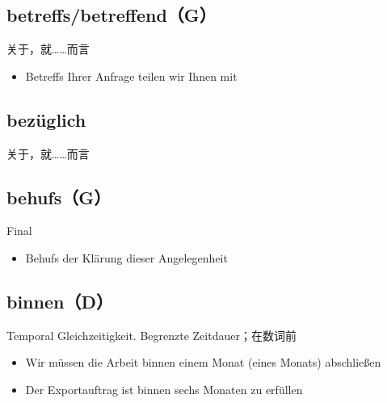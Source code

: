\documentclass[UTF8]{report}
\begin{document}
\subsection{betreffs/betreffend（G）}
关于，就……而言
\begin{itemize}
    \item Betreffs Ihrer Anfrage teilen wir Ihnen mit
\end{itemize}

\subsection{bezüglich}
关于，就……而言



\subsection{behufs（G）}
Final
\begin{itemize}
    \item Behufs der Klärung dieser Angelegenheit
\end{itemize}


\subsection{binnen（D）}
Temporal Gleichzeitigkeit. Begrenzte Zeitdauer；在数词前
\begin{itemize}
    \item Wir müssen die Arbeit binnen einem Monat (eines Monats) abschließen
    \item Der Exportauftrag ist binnen sechs Monaten zu erfüllen
\end{itemize}
\end{document}

